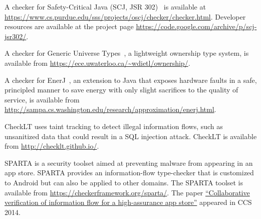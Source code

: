 
A checker for Safety-Critical Java (SCJ, JSR 302)~\cite{TangPJ2010} is available at
\url{https://www.cs.purdue.edu/sss/projects/oscj/checker/checker.html}.
Developer resources are available at the project page
\url{https://code.google.com/archive/p/scj-jsr302/}.








A checker for Generic Universe Types~\cite{DietlEM2011}, a lightweight ownership type
system, is available from
\url{https://ece.uwaterloo.ca/~wdietl/ownership/}.



A checker for EnerJ~\cite{SampsonDFGCG2011}, an extension to Java that exposes hardware faults
in a safe, principled manner to save energy with only
slight sacrifices to the quality of service, is available from
\url{http://sampa.cs.washington.edu/research/approximation/enerj.html}.



CheckLT uses taint tracking to detect illegal information flows, such as
unsanitized data that could result in a SQL injection attack.
CheckLT is available from \url{http://checklt.github.io/}.



SPARTA is a security toolset aimed at preventing malware from appearing in
an app store.  SPARTA provides an information-flow type-checker that is
customized to Android but can also be applied to other domains.
The SPARTA toolset is available from
\url{https://checkerframework.org/sparta/}.
The paper
\href{https://homes.cs.washington.edu/~mernst/pubs/infoflow-ccs2014.pdf}{``Collaborative
    verification of information flow for a high-assurance app store''}
  appeared in CCS 2014.


